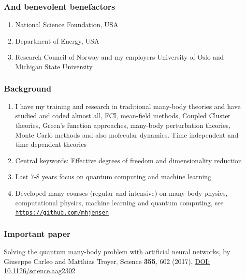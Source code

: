 \documentclass[11pt]{beamer} %
\begin{document}
\begin{frame}
\frametitle{And benevolent benefactors}

\begin{enumerate}
\item National Science Foundation, USA

\item Department of Energy, USA

\item Research Council of Norway and my employers University of Oslo and Michigan State University
\end{enumerate}

\noindent
\end{frame}

\begin{frame}
\frametitle{Background}

\begin{enumerate}
\item I have my training and research in traditional many-body theories and have studied and coded almost all, FCI, mean-field methods, Coupled Cluster theories, Green's function approaches, many-body perturbation theories, Monte Carlo methods and also molecular dynamics. Time independent and time-dependent theories

\item Central keywords: Effective degrees of freedom and dimensionality reduction

\item Last 7-8 years  focus on quantum computing and machine learning

\item Developed many courses (regular and intensive) on many-body physics, computational physics, machine learning and quantum computing, see \href{{https://github.com/mhjensen}}{\nolinkurl{https://github.com/mhjensen}}
\end{enumerate}

\noindent
\end{frame}

\begin{frame}
\frametitle{Important paper}

\begin{block}{}
Solving the quantum many-body problem with artificial neural networks, by 
Giuseppe  Carleo and Matthias Troyer, Science {\bf 355}, 602 (2017), \url{DOI: 10.1126/science.aag2302}
\end{block}
\end{frame}
\end{document}
